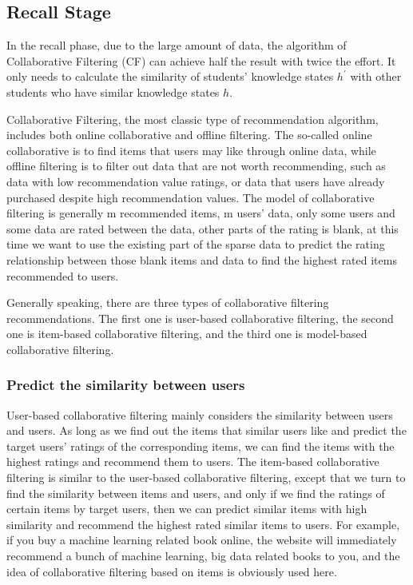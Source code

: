 \subsection{Recall Stage}
In the recall phase, due to the large amount of data, the algorithm of Collaborative Filtering (CF) can achieve half the result with twice the effort. It only needs to calculate the similarity of students' knowledge states $h^\prime$ with other students who have similar knowledge states $h$.

Collaborative Filtering, the most classic type of recommendation algorithm, includes both online collaborative and offline filtering. The so-called online collaborative is to find items that users may like through online data, while offline filtering is to filter out data that are not worth recommending, such as data with low recommendation value ratings, or data that users have already purchased despite high recommendation values. The model of collaborative filtering is generally m recommended items, m users' data, only some users and some data are rated between the data, other parts of the rating is blank, at this time we want to use the existing part of the sparse data to predict the rating relationship between those blank items and data to find the highest rated items recommended to users. 

Generally speaking, there are three types of collaborative filtering recommendations. The first one is user-based collaborative filtering, the second one is item-based collaborative filtering, and the third one is model-based collaborative filtering.

\subsubsection{Predict the similarity between users}
User-based collaborative filtering mainly considers the similarity between users and users. As long as we find out the items that similar users like and predict the target users' ratings of the corresponding items, we can find the items with the highest ratings and recommend them to users. The item-based collaborative filtering is similar to the user-based collaborative filtering, except that we turn to find the similarity between items and users, and only if we find the ratings of certain items by target users, then we can predict similar items with high similarity and recommend the highest rated similar items to users. For example, if you buy a machine learning related book online, the website will immediately recommend a bunch of machine learning, big data related books to you, and the idea of collaborative filtering based on items is obviously used here.

